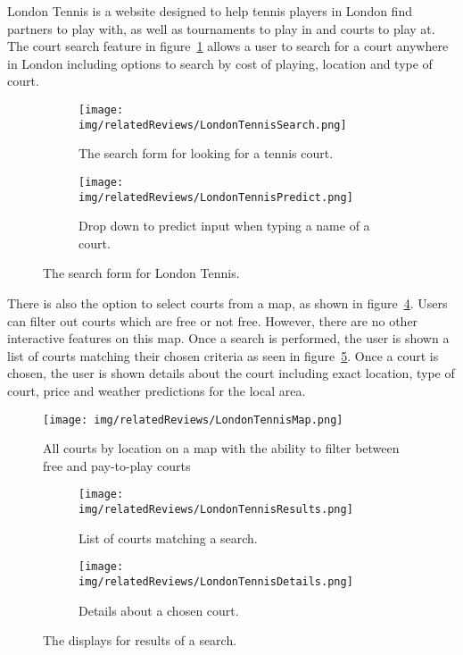 London Tennis is a website designed to help tennis players in London find
partners to play with, as well as tournaments to play in and courts to play at.
The court search feature in figure~\ref{fig:LondonTennisSearch} allows a user
to search for a court anywhere in London including options to search by cost of
playing, location and type of court.
\begin{figure}[ht]
	\centering
	\begin{subfigure}[b]{0.6\textwidth}
		\texttt{[image: img/relatedReviews/LondonTennisSearch.png]}
		\caption{The search form for looking for a tennis court.
		}\label{fig:LondonTennisSearch}
	\end{subfigure}%
	\qquad
	\begin{subfigure}[b]{0.35\textwidth}
		\texttt{[image: img/relatedReviews/LondonTennisPredict.png]}
		\caption{Drop down to predict input when typing a name of a court.
		}\label{fig:LondonTennisPredict}
	\end{subfigure}
	\qquad
	\caption{The search form for London Tennis.
	}\label{fig:LondonTennisSearchMain}
\end{figure}

There is also the option to select courts from a map, as shown in
figure~\ref{fig:LondonTennisMap}. Users can filter out courts which are free or
not free. However, there are no other interactive features on this map. Once a
search is performed, the user is shown a list of courts matching their chosen
criteria as seen in figure~\ref{fig:LondonTennisResults}. Once a court is
chosen, the user is shown details about the court including exact location,
type of court, price and weather predictions for the local area.
\begin{figure}
	\begin{center}
		\texttt{[image: img/relatedReviews/LondonTennisMap.png]}
	\end{center}
	\caption{All courts by location on a map with the ability to filter between
	free and pay-to-play courts}\label{fig:LondonTennisMap}
\end{figure}

\begin{figure}[ht]
	\centering
	\begin{subfigure}[b]{0.7\textwidth}
		\texttt{[image: img/relatedReviews/LondonTennisResults.png]}
		\caption{List of courts matching a search.
		}\label{fig:LondonTennisResults}
	\end{subfigure}
	\begin{subfigure}[b]{0.7\textwidth}
		\texttt{[image: img/relatedReviews/LondonTennisDetails.png]}
		\caption{Details about a chosen court. }\label{fig:LondonTennisDetails}
	\end{subfigure}
	\caption{The displays for results of a search.
	}\label{fig:LondonTennisResultsMain}
\end{figure}

